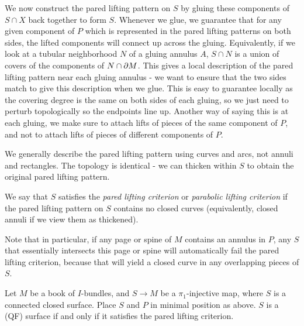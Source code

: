We now construct the pared lifting pattern on $S$ by gluing these components of
$S \cap X$ back together to form $S$. Whenever we glue, we guarantee that for
any given component of $P$ which is represented in the pared lifting patterns
on both sides, the lifted components will connect up across the gluing.
Equivalently, if we look at a tubular neighborhood $N$ of a gluing annulus $A$,
$S \cap N$ is a union of covers of the components of $N \cap \partial M$. This gives
a local description of the pared lifting pattern near each gluing annulus - we
want to ensure that the two sides match to give this description when we glue.
This is easy to guarantee locally as the covering degree is the same on both
sides of each gluing, so we just need to perturb topologically so the endpoints
line up.  Another way of saying this is at each gluing, we make sure to attach
lifts of pieces of the same component of $P$, and not to attach lifts of pieces
of different components of $P$.

We generally describe the pared lifting pattern using curves and arcs, not
annuli and rectangles. The topology is identical - we can thicken within $S$ to
obtain the original pared lifting pattern.

\begin{defn}

We say that $S$ satisfies the \emph{pared lifting criterion} or \emph{parabolic
lifting criterion} if the pared lifting pattern on $S$ contains no closed
curves (equivalently, closed annuli if we view them as thickened).

\end{defn}

Note that in particular, if any page or spine of $M$ contains an annulus in
$P$, any $S$ that essentially intersects this page or spine will automatically
fail the pared lifting criterion, because that will yield a closed curve in any
overlapping pieces of $S$.

\begin{theorem}\label{T:lift}

Let $M$ be a book of $I$-bundles, and $S \to M$ be a $\pi_1$-injective map,
where $S$ is a connected closed surface.  Place $S$ and $P$ in minimal position
as above.  $S$ is a (QF) surface if and only if it satisfies the pared lifting
criterion.

\end{theorem}

